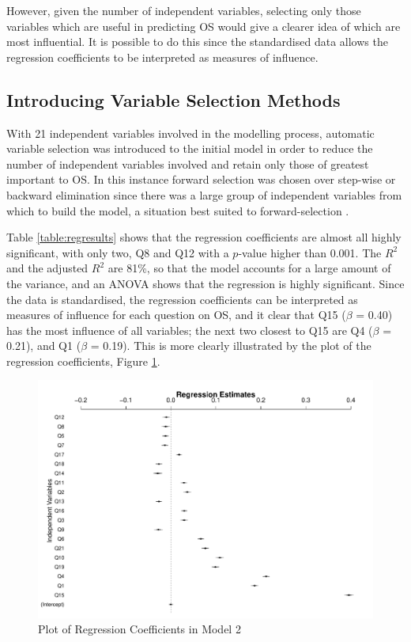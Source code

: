 \documentclass[11pt,a4paper]{report}
\begin{document}
However, given the number of independent variables, selecting only those variables which are useful in predicting \ac{OS} would give a clearer idea of which are most influential. It is possible to do this since the standardised data allows the regression coefficients to be interpreted as measures of influence. 


\subsection{Introducing Variable Selection Methods} \label{Reg Varb Selection}
With 21 independent variables involved in the modelling process, automatic variable selection was introduced to the initial model in order to reduce the number of independent variables involved and retain only those of greatest important to \ac{OS}. In this instance forward selection was chosen over step-wise or backward elimination since there was a large group of independent variables from which to build the model, a situation best suited to forward-selection \cite{field2009discovering}.  

Table \ref{table:regresults} shows that the regression coefficients are almost all highly significant, with only two, Q8 and Q12 with a $p$-value higher than 0.001. 
The $R^{2}$ and the adjusted $R^{2}$ are 81\%, so that the model accounts for a large amount of the variance, and an \ac{ANOVA} shows that the regression is highly significant. Since the data is standardised, the regression coefficients can be interpreted as measures of influence for each question on \ac{OS}, and it clear that Q15 ($\beta$ = 0.40) has the most influence of all variables; the next two closest to Q15 are Q4 ($\beta$ = 0.21), and Q1 ($\beta$ = 0.19). This is more clearly illustrated by the plot of the regression coefficients, Figure \ref{fig:Model2_CoeffPlot}. 

\begin{figure}[H]
\includegraphics[scale=0.4]{images/Model2_CoeffPlot}
\caption{Plot of Regression Coefficients in Model 2}
\label{fig:Model2_CoeffPlot}
\end{figure}
\end{document}
